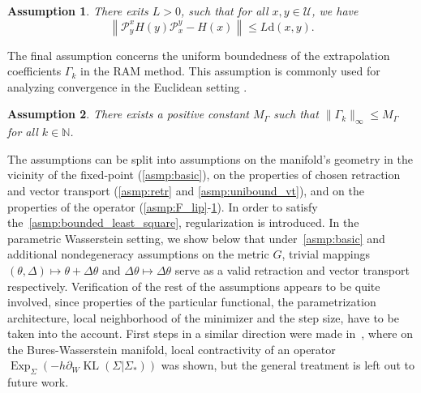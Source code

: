 \documentclass{article} %
\newtheorem{assumption}{Assumption}[section]
\numberwithin{equation}{subsection}
\numberwithin{theorem}{section}
\newcommand{\cP}{\mathcal{P}}
\newcommand{\cU}{\mathcal{U}}
\newcommand{\dist}{\mathrm{d}}
\newcommand{\rExp}{\operatorname{Exp}}
\begin{document}
    \begin{assumption}\label{asmp:jacobian}
    There exits $L > 0$, such that for all $x,y\in\cU$, we have 
    \[
        \left\| \cP_y^x H(y) \cP_x^y - H(x) \right\| \leq L \dist(x,y).
    \]
    \end{assumption}
    The final assumption concerns the uniform boundedness of the extrapolation coefficients $\Gamma_k$ in the RAM method. This assumption is commonly used for analyzing convergence in the Euclidean setting \cite[Assumption 2.1]{toth2015convergence}.  
    \begin{assumption}\label{asmp:bounded_least_square}
    There exists a positive constant $M_{\Gamma}$ such that  $\|\Gamma_k\|_{\infty} \leq M_{\Gamma}$ for all $ k\in\mathbb{N}$.
    \end{assumption}
    The assumptions can be split into assumptions on the manifold's geometry in the vicinity of the fixed-point (\autoref{asmp:basic}), on the properties of chosen retraction and vector transport (\autoref{asmp:retr} and \ref{asmp:unibound_vt}), and on the properties of the operator (\autoref{asmp:F_lip}-\ref{asmp:jacobian}).
    In order to satisfy the~\autoref{asmp:bounded_least_square}, regularization is introduced.
    In the parametric Wasserstein setting, we show below that under~\autoref{asmp:basic} and additional nondegeneracy assumptions on the metric $G$, trivial mappings $(\theta, \Delta) \mapsto \theta + \Delta\theta$ and $\Delta\theta \mapsto \Delta\theta$ serve as a valid retraction and vector transport respectively.
    Verification of the rest of the assumptions appears to be quite involved, since properties of the particular functional, the parametrization architecture, local neighborhood of the minimizer and the step size, have to be taken into the account.
    First steps in a similar direction were made in~\cite{aksenov2026anderson}, where on the Bures-Wasserstein manifold, local contractivity of an operator $\rExp_\Sigma(-h \partial_W\operatorname{KL}(\Sigma|\Sigma_*))$ was shown, but the general treatment is left out to future work.
\end{document}
